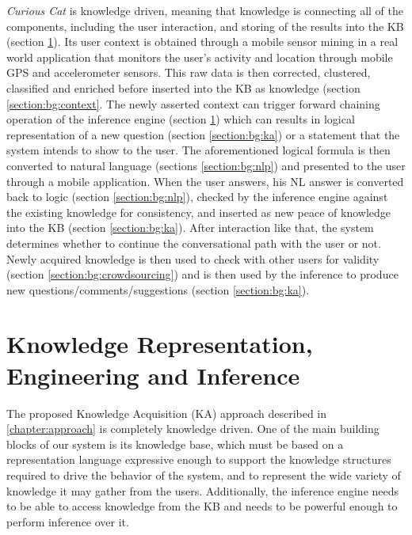 \emph{Curious Cat} is knowledge driven, meaning that knowledge is connecting
all of the components, including the user interaction, and storing of the
results into the KB (section \ref{section:bg:knowledge}). Its user context is 
obtained through a mobile sensor mining in a real world application that 
monitors the user’s activity and location through mobile GPS and accelerometer 
sensors. This raw data is then corrected, clustered, classified and enriched 
before inserted into the KB as knowledge (section \ref{section:bg:context}.
The newly asserted context can trigger forward chaining operation of the 
inference engine (section \ref{section:bg:knowledge}) which can results in
logical representation of a new question (section \ref{section:bg:ka}) or a 
statement that the system intends to show to the user. The aforementioned  
logical formula is then converted to natural language (sections 
\ref{section:bg:nlp}) and presented to the user through a mobile application. 
When the user answers, his NL answer is converted back to logic 
(section \ref{section:bg:nlp}), checked by the inference engine against the 
existing knowledge for consistency, and inserted as new peace of knowledge into 
the KB (section \ref{section:bg:ka}). After interaction like that, the
system determines whether to continue the conversational path with the user or
 not. Newly acquired knowledge is then used to check with other users for
validity (section \ref{section:bg:crowdsourcing}) and is then used by the 
inference to produce new questions/comments/suggestions (section 
\ref{section:bg:ka}).

\section{Knowledge Representation, Engineering and Inference}
\label{section:bg:knowledge}
The proposed Knowledge Acquisition (KA) approach described in 
\autoref{chapter:approach} is completely knowledge driven. One of the main 
building blocks of our system is its knowledge base, which must be based on a 
representation language expressive enough to support the knowledge structures 
required to drive the behavior of the system, and to represent the wide variety 
of knowledge it may gather from the users. Additionally, the inference engine 
needs to be able to access knowledge from the KB and needs to be powerful enough 
to perform inference over it.


